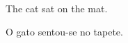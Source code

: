 \documentclass{article}
\begin{document}

The \gls{cat} sat on the \gls{mat}.


O \gls{gato} sentou-se no \gls{tapete}.

\renewcommand*{\glsxtrbookindexname}[1]{%
 \glsxtrifhasfield{prefix}{#1}{\xmakefirstuc\glscurrentfieldvalue\space}{}%
 \glossentryname{#1}%
 \glsxtrifhasfield{useri}{#1}{; translations: \glsxtrseelist\glscurrentfieldvalue}{}%
}
\printunsrtglossaries
\end{document}
